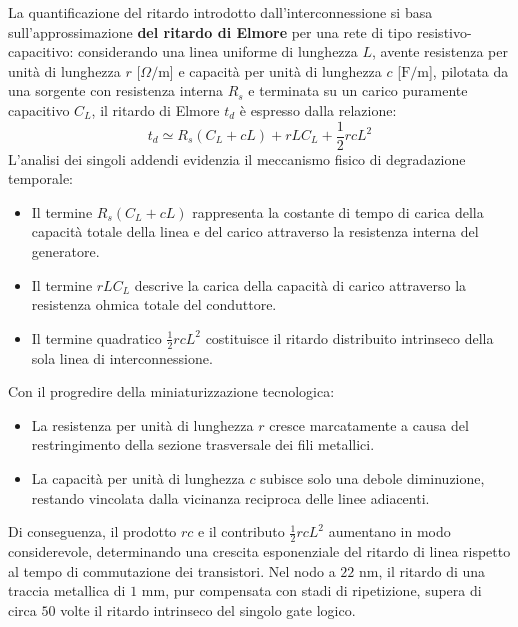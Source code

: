 La quantificazione del ritardo introdotto dall'interconnessione si basa sull'approssimazione \textbf{del ritardo di Elmore} per una rete di tipo resistivo-capacitivo: considerando una linea uniforme di lunghezza $L$, avente resistenza per unità di lunghezza $r$ [$\Omega/\text{m}$] e capacità per unità di lunghezza $c$ [$\text{F/m}$], pilotata da una sorgente con resistenza interna $R_s$ e terminata su un carico puramente capacitivo $C_L$, il ritardo di Elmore $t_d$ è espresso dalla relazione:
\[
t_d \simeq R_s (C_L + c L) + r L C_L + \frac{1}{2} r c L^2
\]
L'analisi dei singoli addendi evidenzia il meccanismo fisico di degradazione temporale:
\begin{itemize}
    \item Il termine $R_s (C_L + c L)$ rappresenta la costante di tempo di carica della capacità totale della linea e del carico attraverso la resistenza interna del generatore.
    \item Il termine $r L C_L$ descrive la carica della capacità di carico attraverso la resistenza ohmica totale del conduttore.
    \item Il termine quadratico $\frac{1}{2} r c L^2$ costituisce il ritardo distribuito intrinseco della sola linea di interconnessione.
\end{itemize}

Con il progredire della miniaturizzazione tecnologica:
\begin{itemize}
    \item La resistenza per unità di lunghezza $r$ cresce marcatamente a causa del restringimento della sezione trasversale dei fili metallici.
    \item La capacità per unità di lunghezza $c$ subisce solo una debole diminuzione, restando vincolata dalla vicinanza reciproca delle linee adiacenti.
\end{itemize}
Di conseguenza, il prodotto $r c$ e il contributo $\frac{1}{2} r c L^2$ aumentano in modo considerevole, determinando una crescita esponenziale del ritardo di linea rispetto al tempo di commutazione dei transistori. Nel nodo a $22\text{ nm}$, il ritardo di una traccia metallica di $1\text{ mm}$, pur compensata con stadi di ripetizione, supera di circa $50$ volte il ritardo intrinseco del singolo gate logico.

